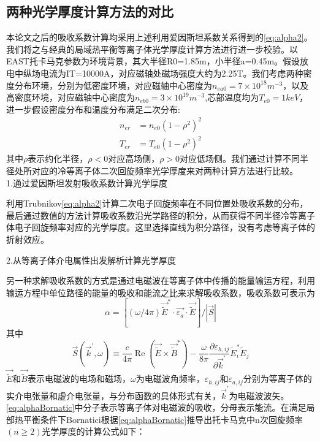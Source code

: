 \subsection{两种光学厚度计算方法的对比}
本论文之后的吸收系数计算均采用上述利用爱因斯坦系数关系得到的\autoref{eq:alpha2}。我们将之与经典的局域热平衡等离子体光学厚度计算方法\cite{RN1952}进行进一步校验。以EAST托卡马克参数为环境背景，其大半径R0=1.85m，小半径a=0.45m。假设放电中纵场电流为IT=10000A，对应磁轴处磁场强度大约为2.25T。我们考虑两种密度分布环境，分别为低密度环境，对应磁轴中心密度为$n_{ea0}=7\times10^{18}m^{-3}$，以及高密度环境，对应磁轴中心密度为$n_{eb0}=3\times10^{19}m^{-3}$,芯部温度均为$T_{e0}=1keV$，进一步假设密度分布和温度分布满足二次分布:
\begin{align}
n_{e r} & =n_{e 0} \left(1-\rho^{2}\right)^{2} \label{eq:nr}\\
T_{e r} & =T_{e 0} \left(1-\rho^{2}\right)^{2}\label{eq:Tr}
\end{align}
其中$\rho$表示约化半径，$ρ<0$对应高场侧，$ρ>0$对应低场侧。我们通过计算不同半径处所对应的冷等离子体二次回旋频率光学厚度来对两种计算方法进行比较。\\
\noindent 1.通过爱因斯坦发射吸收系数计算光学厚度\par
利用Trubnikov\autoref{eq:alpha2}计算二次电子回旋频率在不同位置处吸收系数的分布，最后通过数值的方法计算吸收系数沿光学路径的积分，从而获得不同半径冷等离子体电子回旋频率对应的光学厚度。这里选择直线为积分路径，没有考虑等离子体的折射效应。\par
\noindent 2.从等离子体介电属性出发解析计算光学厚度\par
另一种求解吸收系数的方式是通过电磁波在等离子体中传播的能量输运方程，利用输运方程中单位路径的能量的吸收和能流之比来求解吸收系数，吸收系数可表示为\cite{RN1952}
\begin{equation}\label{eq:alphaBornatic}
\alpha=\left[(\omega / 4 \pi) \overrightarrow{\widetilde{E}}^{*} \cdot \overrightarrow{\varepsilon_{a}} \cdot \overrightarrow{\tilde{E}}\right] /|\vec{S}|
\end{equation}
其中
\begin{equation}
\vec{S}\left(\vec{k}^{\prime}, \omega\right) \equiv \frac{c}{4 \pi} \operatorname{Re}\left(\overrightarrow{\widetilde{E}} \times \vec{\widetilde{B}}^{*}\right)-\frac{\omega}{8 \pi} \frac{\partial \varepsilon_{h, i j}}{\partial \vec{k}^{\prime}} \widetilde{E}_{i}^{*} \tilde{E}_{j}
\end{equation}
$\overrightarrow{\widetilde{E}} $和$\vec{\widetilde{B}}$表示电磁波的电场和磁场，$\omega$为电磁波角频率，$\varepsilon_{h, i j}$和$\varepsilon_{a, i j}$分别为等离子体的实介电张量和虚介电张量，与分布函数的具体形式有关，$\vec{k}^{\prime}$为电磁波波矢。\autoref{eq:alphaBornatic}中分子表示等离子体对电磁波的吸收，分母表示能流。在满足局部热平衡条件下Bornatici根据\autoref{eq:alphaBornatic}推导出托卡马克中n次回旋频率$(n≥2)$光学厚度的计算公式如下\cite{RN351}：
